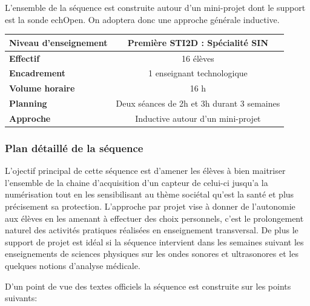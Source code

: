 \documentclass[12pt]{article}
\begin{document}
L'ensemble de la séquence est construite autour d'un mini-projet dont le support est la sonde echOpen. On adoptera donc une approche générale inductive. 


\vspace{20pt}
\begin{center}


\begin{tabular}{|>{\bf}l|c|} \hline
Niveau d'enseignement & Première STI2D : Spécialité SIN  \\ \hline
Effectif  & 16 élèves \\\hline 
Encadrement  & 1 enseignant technologique \\\hline 
Volume horaire  & 16 h \\\hline 
Planning  & Deux séances de 2h et 3h durant 3 semaines \\\hline 
Approche  & Inductive autour d'un mini-projet \\\hline 



\end{tabular}
\end{center}


\newpage

\subsubsection{Plan détaillé de la séquence}

L'ojectif principal de cette séquence est d'amener les élèves à bien maitriser l'ensemble de la chaine d'acquisition d'un capteur de celui-ci jusqu'a la numérisation tout en les sensibilisant au thème sociétal qu'est la santé et plus précisement sa protection. L'approche par projet vise à donner de l'autonomie aux élèves en les amenant à effectuer des choix personnels, c'est le prolongement naturel des activités pratiques réalisées en enseignement transversal. De plus le support de projet est idéal si la séquence intervient dans les semaines suivant les enseignements de sciences physiques sur les ondes sonores et ultrasonores et les quelques notions d'analyse médicale.\par
\vspace{10pt}

D'un point de vue des textes officiels la séquence est construite sur les points suivants:\par
\vspace{15pt}
\end{document}
